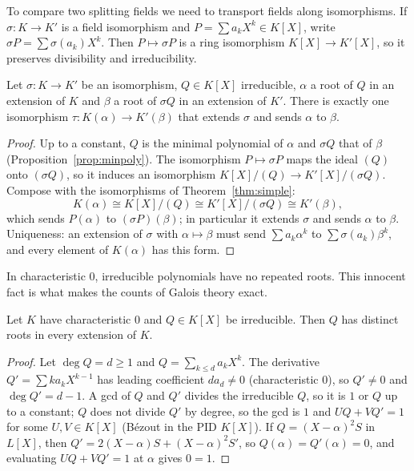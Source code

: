 To compare two splitting fields we need to transport fields along isomorphisms. If $\sigma:K\to K'$ is a field isomorphism and $P=\sum a_kX^k\in K[X]$, write $\sigma P=\sum\sigma(a_k)X^k$. Then $P\mapsto\sigma P$ is a ring isomorphism $K[X]\to K'[X]$, so it preserves divisibility and irreducibility.

\begin{lemma}\label{lem:extend1}
Let $\sigma:K\to K'$ be an isomorphism, $Q\in K[X]$ irreducible, $\alpha$ a root of $Q$ in an extension of $K$ and $\beta$ a root of $\sigma Q$ in an extension of $K'$. There is exactly one isomorphism $\tau:K(\alpha)\to K'(\beta)$ that extends $\sigma$ and sends $\alpha$ to $\beta$.
\end{lemma}
\begin{proof}
Up to a constant, $Q$ is the minimal polynomial of $\alpha$ and $\sigma Q$ that of $\beta$ (Proposition~\ref{prop:minpoly}). The isomorphism $P\mapsto\sigma P$ maps the ideal $(Q)$ onto $(\sigma Q)$, so it induces an isomorphism $K[X]/(Q)\to K'[X]/(\sigma Q)$. Compose with the isomorphisms of Theorem~\ref{thm:simple}:
\[
K(\alpha)\cong K[X]/(Q)\cong K'[X]/(\sigma Q)\cong K'(\beta),
\]
which sends $P(\alpha)$ to $(\sigma P)(\beta)$; in particular it extends $\sigma$ and sends $\alpha$ to $\beta$. Uniqueness: an extension of $\sigma$ with $\alpha\mapsto\beta$ must send $\sum a_k\alpha^k$ to $\sum\sigma(a_k)\beta^k$, and every element of $K(\alpha)$ has this form.
\end{proof}

In characteristic $0$, irreducible polynomials have no repeated roots. This innocent fact is what makes the counts of Galois theory exact.

\begin{lemma}\label{lem:sep}
Let $K$ have characteristic $0$ and $Q\in K[X]$ be irreducible. Then $Q$ has distinct roots in every extension of $K$.
\end{lemma}
\begin{proof}
Let $\deg Q=d\ge1$ and $Q=\sum_{k\le d}a_kX^k$. The derivative $Q'=\sum ka_kX^{k-1}$ has leading coefficient $da_d\ne0$ (characteristic $0$), so $Q'\ne0$ and $\deg Q'=d-1$. A gcd of $Q$ and $Q'$ divides the irreducible $Q$, so it is $1$ or $Q$ up to a constant; $Q$ does not divide $Q'$ by degree, so the gcd is $1$ and $UQ+VQ'=1$ for some $U,V\in K[X]$ (Bézout in the PID $K[X]$). If $Q=(X-\alpha)^2S$ in $L[X]$, then $Q'=2(X-\alpha)S+(X-\alpha)^2S'$, so $Q(\alpha)=Q'(\alpha)=0$, and evaluating $UQ+VQ'=1$ at $\alpha$ gives $0=1$.
\end{proof}


